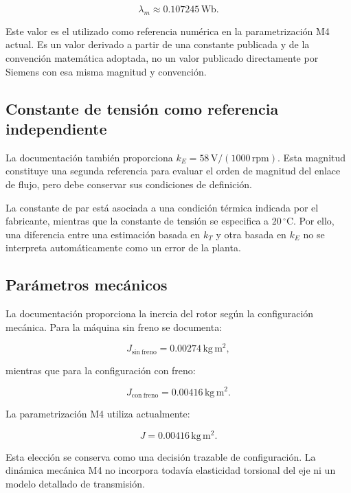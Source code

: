 \begin{equation}
\lambda_m\approx0.107245\,\mathrm{Wb}.
\end{equation}

Este valor es el utilizado como referencia numérica en la parametrización M4 actual. Es un valor derivado a partir de una constante publicada y de la convención matemática adoptada, no un valor publicado directamente por Siemens con esa misma magnitud y convención.

\subsection{Constante de tensión como referencia independiente}

La documentación también proporciona $k_E=58\,\mathrm{V/(1000\,rpm)}$. Esta magnitud constituye una segunda referencia para evaluar el orden de magnitud del enlace de flujo, pero debe conservar sus condiciones de definición.

La constante de par está asociada a una condición térmica indicada por el fabricante, mientras que la constante de tensión se especifica a $20\,^{\circ}\mathrm{C}$. Por ello, una diferencia entre una estimación basada en $k_T$ y otra basada en $k_E$ no se interpreta automáticamente como un error de la planta.

\subsection{Parámetros mecánicos}

La documentación proporciona la inercia del rotor según la configuración mecánica. Para la máquina sin freno se documenta:

\begin{equation}
J_{\mathrm{sin\ freno}}=0.00274\,\mathrm{kg\,m^2},
\end{equation}

mientras que para la configuración con freno:

\begin{equation}
J_{\mathrm{con\ freno}}=0.00416\,\mathrm{kg\,m^2}.
\end{equation}

La parametrización M4 utiliza actualmente:

\begin{equation}
J=0.00416\,\mathrm{kg\,m^2}.
\end{equation}

Esta elección se conserva como una decisión trazable de configuración. La dinámica mecánica M4 no incorpora todavía elasticidad torsional del eje ni un modelo detallado de transmisión.

